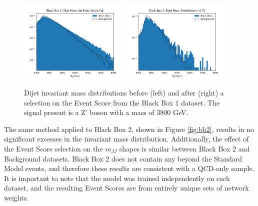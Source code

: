 \documentclass[letterpaper,11pt]{article}
\begin{document}
\begin{figure}[h!]
	\begin{center}
		\includegraphics[width=0.47\textwidth]{imgs/BB1.png}
		\includegraphics[width=0.47\textwidth]{imgs/BB1_Cut.png}
	\end{center}
	\caption{Dijet invariant mass distributions before (left) and after (right) a selection on the Event Score from the Black Box 1 dataset. The signal present is a Z' boson with a mass of 3800 GeV.}
	\label{fig:bb1}
\end{figure}

The same method applied to Black Box 2, shown in Figure \ref{fig:bb2}, results in no significant excesses in the invariant mass distribution. Additionally, the effect of the Event Score selection on the $m_{JJ}$ shapes is similar between Black Box 2 and Background datasets. Black Box 2 does not contain any beyond the Standard Model events, and therefore these results are consistent with a QCD-only sample. It is important to note that the model was trained independently on each dataset, and the resulting Event Scores are from entirely unique sets of network weights.
\end{document}
